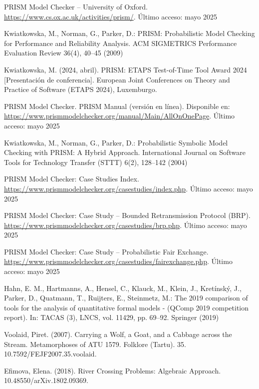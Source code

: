 \documentclass[runningheads]{llncs}
\begin{document}
\begin{thebibliography}{8}
PRISM Model Checker – University of Oxford. \url{https://www.cs.ox.ac.uk/activities/prism/}. Último acceso: mayo 2025

Kwiatkowska, M., Norman, G., Parker, D.: PRISM: Probabilistic Model Checking for Performance and Reliability Analysis. ACM SIGMETRICS Performance Evaluation Review 36(4), 40--45 (2009)

Kwiatkowska, M. (2024, abril). PRISM: ETAPS Test-of-Time Tool Award 2024 [Presentación de conferencia]. European Joint Conferences on Theory and Practice of Software (ETAPS 2024), Luxemburgo.

PRISM Model Checker. PRISM Manual (versión en línea). Disponible en: \url{https://www.prismmodelchecker.org/manual/Main/AllOnOnePage}. Último acceso: mayo 2025

Kwiatkowska, M., Norman, G., Parker, D.: Probabilistic Symbolic Model Checking with PRISM: A Hybrid Approach. International Journal on Software Tools for Technology Transfer (STTT) 6(2), 128--142 (2004)

PRISM Model Checker: Case Studies Index. \url{https://www.prismmodelchecker.org/casestudies/index.php}. Último acceso: mayo 2025

PRISM Model Checker: Case Study – Bounded Retransmission Protocol (BRP). \url{https://www.prismmodelchecker.org/casestudies/brp.php}. Último acceso: mayo 2025

PRISM Model Checker: Case Study – Probabilistic Fair Exchange. \url{https://www.prismmodelchecker.org/casestudies/fairexchange.php}. Último acceso: mayo 2025

Hahn, E. M., Hartmanns, A., Hensel, C., Klauck, M., Klein, J., Kretínský, J., Parker, D., Quatmann, T., Ruijters, E., Steinmetz, M.: The 2019 comparison of tools for the analysis of quantitative formal models - (QComp 2019 competition report). In: TACAS (3), LNCS, vol. 11429, pp. 69–92. Springer (2019)

Voolaid, Piret. (2007). Carrying a Wolf, a Goat, and a Cabbage across the Stream. Metamorphoses of ATU 1579. Folklore (Tartu). 35. 10.7592/FEJF2007.35.voolaid. 

Efimova, Elena. (2018). River Crossing Problems: Algebraic Approach. 10.48550/arXiv.1802.09369. 

\end{thebibliography}
\end{document}
